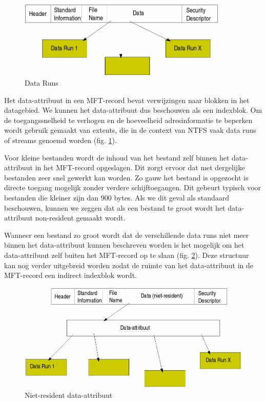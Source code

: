 \begin{figure}
\begin{center}
\includegraphics[width=100mm]{images/fig0417.png}
\caption{Data Runs}
\label{dataruns}
\end{center}
\end{figure}

Het data-attribuut in een MFT-record bevat verwijzingen naar
blokken in het datagebied. We kunnen het data-attribuut dus beschouwen
als een indexblok. Om de toegangssnelheid te verhogen en de
hoeveelheid adresinformatie te beperken wordt gebruik gemaakt van
extents, die in de context van NTFS vaak data runs of streams genoemd
worden (fig. \ref{dataruns}).

Voor kleine bestanden wordt de inhoud van het bestand zelf
binnen het data-attribuut in het MFT-record opgeslagen. Dit zorgt
ervoor dat met dergelijke bestanden zeer snel gewerkt kan worden. Zo
gauw het bestand is opgezocht is directe toegang mogelijk zonder
verdere schijftoegangen. Dit gebeurt typisch voor bestanden die
kleiner zijn dan 900 bytes. Als we dit geval als standaard
beschouwen, kunnen we zeggen dat als een bestand te groot wordt het
data-attribuut non-resident gemaakt wordt.

Wanneer een bestand zo groot wordt dat de verschillende data
runs niet meer binnen het data-attribuut kunnen beschreven worden is
het mogelijk om het data-attribuut zelf buiten het MFT-record op te
slaan (fig. \ref{nonresdata}). Deze structuur kan nog verder uitgebreid worden zodat de ruimte
van het data-attribuut in de MFT-record een indirect indexblok
wordt.

\begin{figure}
\begin{center}
\includegraphics[width=120mm]{images/fig0418.png}
\caption{Niet-resident data-attribuut}
\label{nonresdata}
\end{center}
\end{figure}

